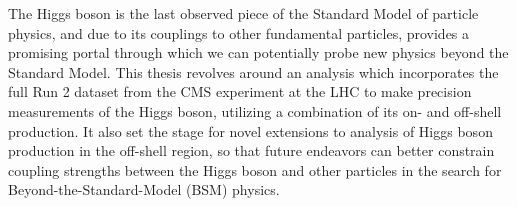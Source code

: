 

The Higgs boson is the last observed piece of the Standard Model of particle physics, and due to its couplings to other fundamental particles, provides a promising portal through which we can potentially probe new physics beyond the Standard Model. This thesis revolves around an analysis which incorporates the full Run 2 dataset from the CMS experiment at the LHC to make precision measurements of the Higgs boson, utilizing a combination of its on- and off-shell production. It also set the stage for novel extensions to analysis of Higgs boson production in the off-shell region, so that future endeavors can better constrain coupling strengths between the Higgs boson and other particles in the search for Beyond-the-Standard-Model (BSM) physics. 

\vspace{1in}










    

    


